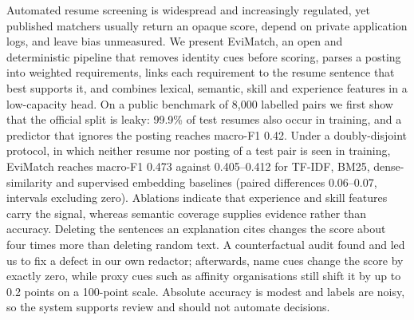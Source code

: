 Automated resume screening is widespread and increasingly regulated, yet published matchers usually return an
opaque score, depend on private application logs, and leave bias unmeasured. We present EviMatch, an open and
deterministic pipeline that removes identity cues before scoring, parses a posting into weighted requirements,
links each requirement to the resume sentence that best supports it, and combines lexical, semantic, skill and
experience features in a low-capacity head. On a public benchmark of 8,000 labelled pairs we first show that the
official split is leaky: 99.9\% of test resumes also occur in training, and a predictor that ignores the posting
reaches macro-F1 0.42. Under a doubly-disjoint protocol, in which neither resume nor posting of a test pair is
seen in training, EviMatch reaches macro-F1 0.473 against 0.405--0.412 for TF-IDF, BM25, dense-similarity and
supervised embedding baselines (paired differences 0.06--0.07, intervals excluding zero). Ablations indicate that
experience and skill features carry the signal, whereas semantic coverage supplies evidence rather than accuracy.
Deleting the sentences an explanation cites changes the score about four times more than deleting random text.
A counterfactual audit found and led us to fix a defect in our own redactor; afterwards, name cues change the
score by exactly zero, while proxy cues such as affinity organisations still shift it by up to 0.2 points on a
100-point scale. Absolute accuracy is modest and labels are noisy, so the system supports review and should not
automate decisions.
